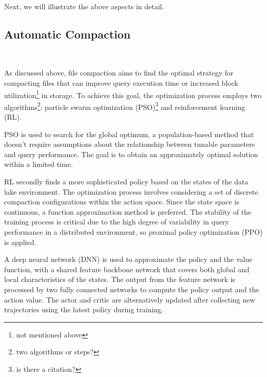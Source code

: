 Next, we will illustrate the above aspects in detail.


\subsection{Automatic Compaction}~\label{subsec:compaction}

As discussed above, file compaction aims to find the optimal strategy for compacting files that can improve query execution time or increased block utilization\footnote{not mentioned above} in storage. To achieve this goal, the optimization process employs two algorithms\footnote{two algorithms or steps?}: particle swarm optimization (PSO)\footnote{is there a citation? } and reinforcement learning (RL).

PSO is used to search for the global optimum, a population-based method that doesn't require assumptions about the relationship between tunable parameters and query performance. The goal is to obtain an approximately optimal solution within a limited time.  


RL secondly finds a more sophisticated policy based on the states of the data lake environment.
The optimization process involves considering a set of discrete compaction configurations within the action space. Since the state space is continuous, a function approximation method is preferred. The stability of the training process is critical due to the high degree of variability in query performance in a distributed environment, so proximal policy optimization (PPO) is applied.

A deep neural network (DNN) is used to approximate the policy and the value function, with a shared feature backbone network that covers both global and local characteristics of the states. The output from the feature network is processed by two fully connected networks to compute the policy output and the action value. The actor and critic are alternatively updated after collecting new trajectories using the latest policy during training.

